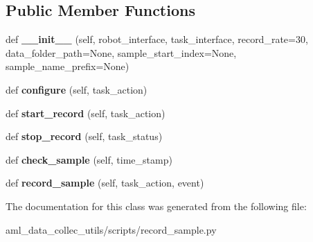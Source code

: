 \subsection*{Public Member Functions}
\begin{DoxyCompactItemize}
\item 
\hypertarget{classscripts_1_1record__sample_1_1_record_sample_a83f0241f415483c96e8bfe85a3553f35}{}\label{classscripts_1_1record__sample_1_1_record_sample_a83f0241f415483c96e8bfe85a3553f35} 
def {\bfseries \+\_\+\+\_\+init\+\_\+\+\_\+} (self, robot\+\_\+interface, task\+\_\+interface, record\+\_\+rate=30, data\+\_\+folder\+\_\+path=None, sample\+\_\+start\+\_\+index=None, sample\+\_\+name\+\_\+prefix=None)
\item 
\hypertarget{classscripts_1_1record__sample_1_1_record_sample_a128694afa20c23eee2e493e5a1b96e65}{}\label{classscripts_1_1record__sample_1_1_record_sample_a128694afa20c23eee2e493e5a1b96e65} 
def {\bfseries configure} (self, task\+\_\+action)
\item 
\hypertarget{classscripts_1_1record__sample_1_1_record_sample_a2f4523a4af92045b68953ae075bd9786}{}\label{classscripts_1_1record__sample_1_1_record_sample_a2f4523a4af92045b68953ae075bd9786} 
def {\bfseries start\+\_\+record} (self, task\+\_\+action)
\item 
\hypertarget{classscripts_1_1record__sample_1_1_record_sample_a458e67a3bc7bcedd1a49d9c343b55389}{}\label{classscripts_1_1record__sample_1_1_record_sample_a458e67a3bc7bcedd1a49d9c343b55389} 
def {\bfseries stop\+\_\+record} (self, task\+\_\+status)
\item 
\hypertarget{classscripts_1_1record__sample_1_1_record_sample_afa324036b715bbe632deb1d44fc69857}{}\label{classscripts_1_1record__sample_1_1_record_sample_afa324036b715bbe632deb1d44fc69857} 
def {\bfseries check\+\_\+sample} (self, time\+\_\+stamp)
\item 
\hypertarget{classscripts_1_1record__sample_1_1_record_sample_ae7b3bf96a4d95b08d589f85974cc835e}{}\label{classscripts_1_1record__sample_1_1_record_sample_ae7b3bf96a4d95b08d589f85974cc835e} 
def {\bfseries record\+\_\+sample} (self, task\+\_\+action, event)
\end{DoxyCompactItemize}


The documentation for this class was generated from the following file\+:\begin{DoxyCompactItemize}
\item 
aml\+\_\+data\+\_\+collec\+\_\+utils/scripts/record\+\_\+sample.\+py\end{DoxyCompactItemize}
